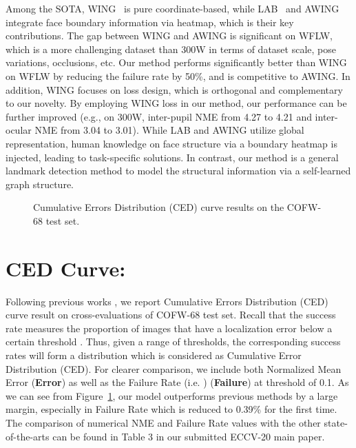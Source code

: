 \documentclass[runningheads]{llncs}
\begin{document}
Among the SOTA, WING~\cite{feng2018wing} is pure coordinate-based, while LAB~\cite{wu2018look} and AWING~\cite{wang2019adaptive} integrate face boundary information via heatmap, which is their key contributions. The gap between WING and AWING is significant on WFLW, which is a more challenging dataset than 300W in terms of dataset scale, pose variations, occlusions, etc. Our method performs significantly better than WING on WFLW by reducing the failure rate by 50\%, and is competitive to AWING. In addition, WING focuses on loss design, which is orthogonal and complementary to our novelty. By employing WING loss in our method, our performance can be further improved (e.g., on 300W, inter-pupil NME from 4.27 to 4.21 and inter-ocular NME from 3.04 to 3.01). While LAB and AWING utilize global representation, human knowledge on face structure via a boundary heatmap is injected, leading to task-specific solutions. In contrast, our method is a general landmark detection method to model the structural information via a self-learned graph structure. 

\begin{figure}[t]
	\centering
\caption{Cumulative Errors Distribution (CED) curve results on the COFW-68 test set.}
	\label{fig:ced}
\end{figure}


\section{CED Curve:}
Following previous works \cite{wu2018look,qian2019aggregation}, we report Cumulative Errors Distribution (CED) curve result on cross-evaluations of COFW-68 test set. Recall that the success rate measures the proportion of images that have a localization error below a certain threshold \cite{ghiasi2015occlusion}. Thus, given a range of thresholds, the corresponding success rates will form a distribution which is considered as Cumulative Error Distribution (CED). For clearer comparison, we include both Normalized Mean Error (\textbf{Error}) as well as the Failure Rate (i.e. ) (\textbf{Failure})  at threshold of 0.1. As we can see from Figure~\ref{fig:ced}, our model outperforms previous methods by a large margin, especially in Failure Rate which is reduced to 0.39\% for the first time. The comparison of numerical NME and Failure Rate values with the other state-of-the-arts can be found in Table 3 in our submitted ECCV-20 main paper.
\end{document}
